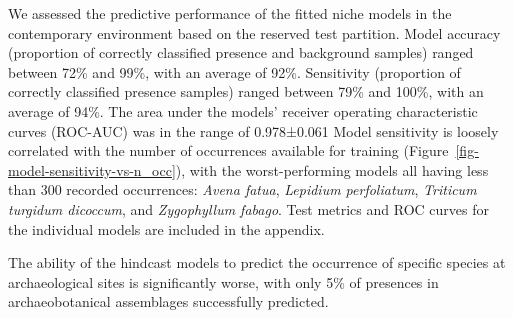 \documentclass[
  authoryear,
  preprint]{elsarticle}
\begin{document}
We assessed the predictive performance of the fitted niche models in the
contemporary environment based on the reserved test partition. Model
accuracy (proportion of correctly classified presence and background
samples) ranged between 72\% and 99\%, with an average of 92\%.
Sensitivity (proportion of correctly classified presence samples) ranged
between 79\% and 100\%, with an average of 94\%. The area under the
models' receiver operating characteristic curves (ROC-AUC) was in the
range of 0.978±0.061 Model sensitivity is loosely correlated with the
number of occurrences available for training
(Figure~\ref{fig-model-sensitivity-vs-n_occ}), with the worst-performing
models all having less than 300 recorded occurrences: \emph{Avena
fatua}, \emph{Lepidium perfoliatum}, \emph{Triticum turgidum dicoccum},
and \emph{Zygophyllum fabago}. Test metrics and ROC curves for the
individual models are included in the appendix.

The ability of the hindcast models to predict the occurrence of specific
species at archaeological sites is significantly worse, with only 5\% of
presences in archaeobotanical assemblages successfully predicted.

\begingroup
\setlength{}
\setlength{}\fontsize{8.2pt}{9.9pt}\selectfont
\end{document}
